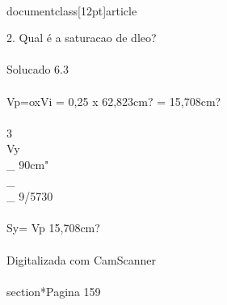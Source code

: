 \\documentclass[12pt]{article}
\begin{document}
2. Qual é a saturacao de dleo?\\
\\
Solucado 6.3\\
\\
Vp=oxVi = 0,25 x 62,823cm? = 15,708cm?\\
\\
3\\
Vy \\_ 90cm" \\_ \\_ 9/5730\\
\\
Sy= Vp 15,708cm?\\
\\
Digitalizada com CamScanner\\

\\section*{Pagina 159}
\end{document}
